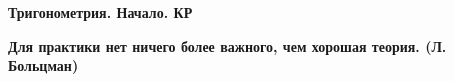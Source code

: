 \centerline{\bf \Huge Тригонометрия. Начало. КР}
\centerline{\bf \Huge }

\begin{flushright}
        \scriptsize{\textbf{Для практики нет ничего более важного, чем хорошая теория. (Л. Больцман)}}
\end{flushright}

